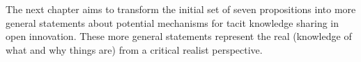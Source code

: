 The next chapter aims to transform the initial set of seven propositions into more general statements about potential mechanisms for tacit knowledge sharing in open innovation. These more general statements represent the real (knowledge of what and why things are) from a critical realist perspective.







